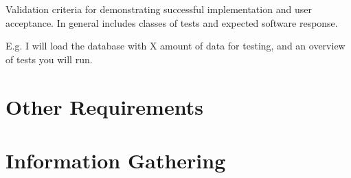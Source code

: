 \documentclass[a4wide]{article}
\begin{document}
\begin{itemize}
Validation criteria for demonstrating
successful implementation and user acceptance.
In general includes classes of tests and expected software response.

E.g. I will load the database with X amount of data for testing,
and an overview of tests you will run.


\section{Other Requirements}
\newpage
\appendix
\appendixpage

\section{Information Gathering}


\end{itemize}
\end{document}
